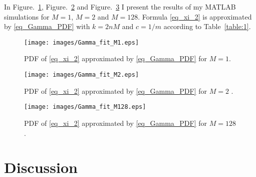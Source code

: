 \documentclass{article}
\begin{document}
In Figure.~\ref{fig_PDF_M1}, Figure.~\ref{fig_PDF_M2} and Figure.~\ref{fig_PDF_M128} I present the results of my MATLAB simulations for $M = 1$, $M = 2$ and $M = 128$. Formula \eqref{eq_xi_2} is approximated by \eqref{eq_Gamma_PDF} with $k = 2nM$ and $c = 1/m$ according to Table~\ref{table:1}.


\begin{figure}[!h] \centering
\texttt{[image: images/Gamma\_fit\_M1.eps]}
\caption{PDF of \eqref{eq_xi_2} approximated by \eqref{eq_Gamma_PDF} for $M=1$. }
\label{fig_PDF_M1}
\end{figure}

\begin{figure}[!h] \centering
\texttt{[image: images/Gamma\_fit\_M2.eps]}
\caption{PDF of \eqref{eq_xi_2} approximated by \eqref{eq_Gamma_PDF} for $M=2$ . }
\label{fig_PDF_M2}
\end{figure}

\begin{figure}[!h] \centering
\texttt{[image: images/Gamma\_fit\_M128.eps]}
\caption{PDF of \eqref{eq_xi_2} approximated by \eqref{eq_Gamma_PDF} for $M=128$ . }
\label{fig_PDF_M128}
\end{figure}




\section{Discussion}
\end{document}
